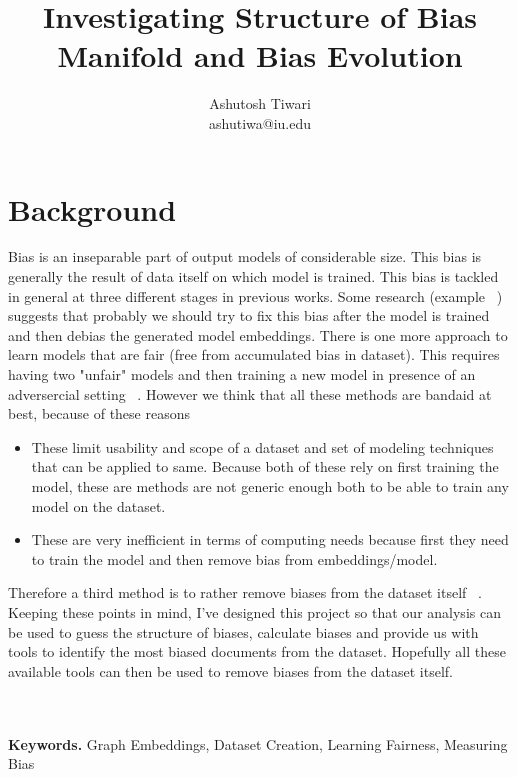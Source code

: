 \documentclass{article}
\title{Investigating Structure of Bias Manifold and Bias Evolution}
\author{Ashutosh Tiwari\\
	\normalsize ashutiwa@iu.edu
}
\begin{document}
\maketitle



\section{Background}

Bias is an inseparable part of output models of considerable size. This bias is generally the result of data itself on which model is trained. This bias is tackled in general at three different stages in previous works. Some research (example ~\cite{DBLP:journals/corr/BolukbasiCZSK16a}) suggests that probably we should try to fix this bias after the model is trained and then debias the generated model embeddings. There is one more approach to learn models  that are fair (free from accumulated bias in dataset). This requires having two "unfair" models and then training a new model in presence of an adversercial setting ~\cite{kenna_using_2021}. However we think that all these methods are bandaid at best, because of these reasons \begin{itemize}
    \item These limit usability and scope of a dataset and set of modeling techniques that can be applied to same. Because both of these rely on first training the model, these are methods are not generic enough both to be able to train any model on the dataset.
    \item These are very inefficient in terms of computing needs because first they need to train the model and then remove bias from embeddings/model.

\end{itemize}

Therefore a third method is to rather remove biases from the dataset itself ~\cite{ravfogel_null_2020}. Keeping these points in mind, I've designed this project so that our analysis can be used to guess the structure of biases, calculate biases and provide us with tools to identify the most biased documents from the dataset. Hopefully all these available tools can then be used to remove biases from the dataset itself.


\\ \\ \hspace \vspace
\noindent \textbf{Keywords.} Graph Embeddings, Dataset Creation, Learning Fairness, Measuring Bias
\end{document}
